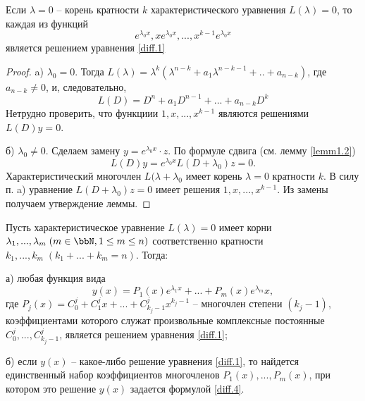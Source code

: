 \begin{lemm} \label{lemm2.3}
Если $\lambda=0$ -- корень кратности $k$ характеристического уравнения $L(\lambda)=0$, то каждая из функций 
$$
e^{\lambda_0 x},xe^{\lambda_0 x},...,x^{k-1}e^{\lambda_0 x}
$$
является решением уравнения \eqref{diff.1}
\end{lemm}

\begin{proof}

a) $\lambda_0=0$. Тогда $L(\lambda)=\lambda^k(\lambda^{n-k}+a_1\lambda^{n-k-1}+..+a_{n-k})$, где  $a_{n-k}\neq 0$, и, следовательно,
$$
L(D)=D^n+a_1D^{n-1}+...+a_{n-k}D^k
$$
Нетрудно проверить, что функциии $1,x,...,x^{k-1}$ являются решениями $L(D)y=0$.

б) $\lambda_0\neq 0$. Сделаем замену $y=e^{\lambda_0x}\cdot z$. По формуле сдвига (см. лемму \ref{lemm1.2})
$$
L(D)y=e^{\lambda_0x}L(D+\lambda_0)z=0.
$$
Характеристический многочлен $L(\lambda+\lambda_0$ имеет корень $\lambda=0$ кратности $k$. В силу п. a) уравнение $L(D+\lambda_0)z=0$ имеет решения $1,x,...,x^{k-1}$. Из замены получаем утверждение леммы.
\end{proof}


\begin{thm} \label{thm1}
Пусть характеристическое уравнение $L(\lambda)=0$ имеет корни $\lambda_1,...,\lambda_m\;(m\in \bbN, 1\leq m\leq n)$ соответственно кратности $k_1,...,k_m\;(k_1+...+k_m=n).$ Тогда:

а) любая функция вида
\begin{equation} \label{diff.4}
y(x)=P_1(x)e^{\lambda_1x}+...+P_m(x)e^{\lambda_m}x,
\end{equation}
где $P_j(x)=C_0^j+C_1^jx+...+C_{k_j-1}^jx^{k_j-1}$ -- многочлен степени $(k_j-1)$, коэффициентами которого служат произвольные комплексные постоянные  $C_0^j,...,C_{k_j-1}^j$, является решением уравнения \eqref{diff.1};

б) если $y(x)$ -- какое-либо решение уравнения \eqref{diff.1}, то найдется единственный набор коэффициентов многочленов $P_1(x),...,P_m(x)$, при котором это решение $y(x)$ задается формулой \eqref{diff.4}.
\end{thm}


